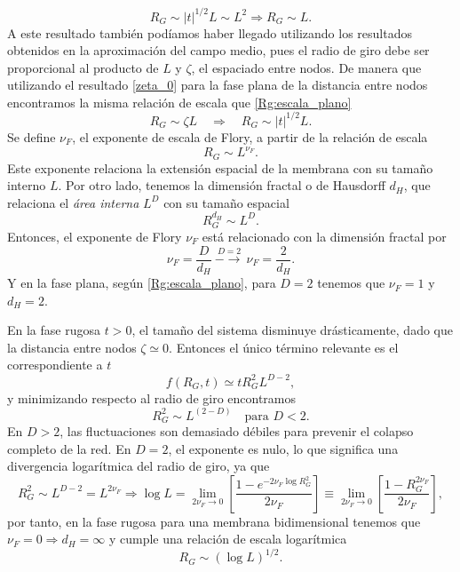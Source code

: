\begin{equation}\label{Rg:escala_plano}
R_G\sim |t|^{1/2}L\sim L^2 \Rightarrow R_G\sim L.
\end{equation}
A este resultado también podíamos haber llegado utilizando los resultados
obtenidos en la aproximación del campo medio, pues el radio de giro debe ser
proporcional al producto de $L$ y $\zeta$, el espaciado entre
nodos. De manera que utilizando el resultado \eqref{zeta_0} para la fase plana
de la distancia entre nodos encontramos la misma relación de escala que \eqref{Rg:escala_plano}
\begin{equation*}
R_G\sim \zeta L \quad \Rightarrow \quad R_G\sim |t|^{1/2}L.
\end{equation*}
Se define $\nu_F$, el exponente de escala de Flory, a partir de la relación de
escala
\begin{equation*}
 R_G\sim L^{\nu_F}. 
\end{equation*}
Este exponente relaciona la extensión espacial de la membrana con su tamaño
interno $L$. Por otro lado, tenemos la dimensión fractal o de Hausdorff $d_H$,
que relaciona el \textit{área interna} $L^D$ con su tamaño espacial
\begin{equation*}
R_G^{d_H}\sim L^D.
\end{equation*} 
Entonces, el exponente de Flory $\nu_F$ está relacionado con la dimensión
fractal por
\begin{equation*}
 \nu_F=\frac{D}{d_H}\ \stackrel{D=2}{-\!\!\!\longrightarrow}\ \nu_F=\frac{2}{d_H}.
\end{equation*}
Y en la fase plana, según \eqref{Rg:escala_plano}, para $D=2$ tenemos que
$\nu_F=1$ y $d_H=2$.


En la fase rugosa $t>0$, el tamaño del sistema disminuye drásticamente, dado que la distancia
entre nodos $\zeta\simeq 0$. Entonces el único término relevante es el correspondiente a $t$
\begin{equation*}
f(R_G,t)\simeq t R_G^2 L^{D-2}, 
\end{equation*}
y minimizando respecto al radio de giro encontramos
\begin{equation*}
R_G^2\sim L^{(2-D)} \quad \text{para } D<2.
\end{equation*}
En $D>2$, las fluctuaciones son demasiado débiles para prevenir el colapso
completo de la red. En $D=2$, el exponente es nulo, lo que significa una
divergencia logarítmica del radio de giro, ya que
\begin{equation*}
R_G^2\sim L^{D-2}=L^{2\nu_F}\Rightarrow \log L=\lim_{2\nu_F\rightarrow
  0}\left[\frac{1-e^{-2\nu_F\log R^2_G}}{2\nu_F}\right]\equiv\lim_{2\nu_F\rightarrow
  0}\left[\frac{1-R^{2\nu_F}_G}{2\nu_F}\right],
\end{equation*}
por tanto, en la fase rugosa para una membrana bidimensional tenemos que
$\nu_F=0\Rightarrow d_H=\infty$ y cumple una relación de escala logarítmica  
\begin{equation*}
R_G\sim(\log L)^{1/2}.
\end{equation*}

